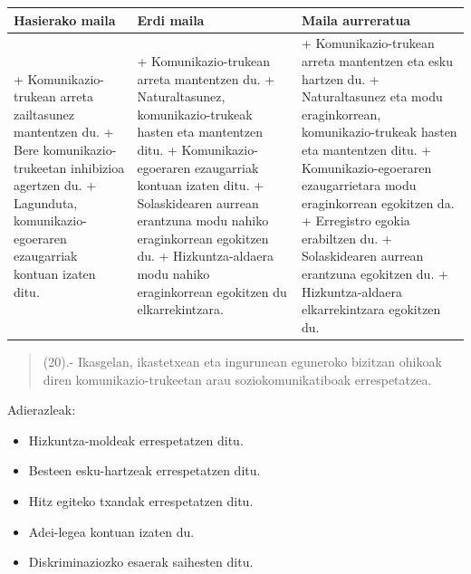 \documentclass[
]{book}
\providecommand{\tightlist}{%
  \setlength{\itemsep}{0pt}\setlength{\parskip}{0pt}}
\begin{document}
\begin{longtable}[]{@{}
  >{\raggedright\arraybackslash}p{}
  >{\raggedright\arraybackslash}p{}
  >{\raggedright\arraybackslash}p{}@{}}
\toprule
Hasierako maila & Erdi maila & Maila aurreratua \\
\midrule
\endhead
+ Komunikazio-trukean arreta zailtasunez mantentzen du. + Bere komunikazio-trukeetan inhibizioa agertzen du. + Lagunduta, komunikazio-egoeraren ezaugarriak kontuan izaten ditu. & + Komunikazio-trukean arreta mantentzen du. + Naturaltasunez, komunikazio-trukeak hasten eta mantentzen ditu. + Komunikazio-egoeraren ezaugarriak kontuan izaten ditu. + Solaskidearen aurrean erantzuna modu nahiko eraginkorrean egokitzen du. + Hizkuntza-aldaera modu nahiko eraginkorrean egokitzen du elkarrekintzara. & + Komunikazio-trukean arreta mantentzen eta esku hartzen du. + Naturaltasunez eta modu eraginkorrean, komunikazio-trukeak hasten eta mantentzen ditu. + Komunikazio-egoeraren ezaugarrietara modu eraginkorrean egokitzen da. + Erregistro egokia erabiltzen du. + Solaskidearen aurrean erantzuna egokitzen du. + Hizkuntza-aldaera elkarrekintzara egokitzen du. \\
\bottomrule
\end{longtable}

\begin{quote}
(20).- Ikasgelan, ikastetxean eta ingurunean eguneroko bizitzan ohikoak diren komunikazio-trukeetan arau soziokomunikatiboak errespetatzea.
\end{quote}

Adierazleak:

\begin{itemize}
\tightlist
\item
  Hizkuntza-moldeak errespetatzen ditu.
\item
  Besteen esku-hartzeak errespetatzen ditu.
\item
  Hitz egiteko txandak errespetatzen ditu.
\item
  Adei-legea kontuan izaten du.
\item
  Diskriminaziozko esaerak saihesten ditu.
\end{itemize}
\end{document}
